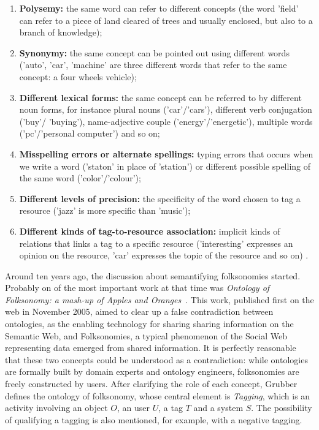 \begin{citacao}
\begin{enumerate}
\item \textbf{Polysemy:} the same word can refer to different concepts (the word ’field’ can refer to a piece of land cleared of trees and usually enclosed, but also to a branch of knowledge);
\item \textbf{Synonymy:} the same concept can be pointed out using different words (’auto’, ’car’, ’machine’ are three different words that refer to the same concept: a four wheels vehicle);
\item \textbf{Different lexical forms:} the same concept can be referred to by different noun forms, for instance plural nouns (’car’/’cars’), different verb conjugation (’buy’/ ’buying’), name-adjective couple (’energy’/’energetic’), multiple words (’pc’/’personal computer’) and so on;
\item \textbf{Misspelling errors or alternate spellings:} typing errors that occurs when we write a word (’staton’ in place of ’station’) or different possible spelling of the same word (’color’/’colour’);
\item \textbf{Different levels of precision:} the specificity of the word chosen to tag a resource (’jazz’ is more specific than ’music’);
\item \textbf{Different kinds of tag-to-resource association:} implicit kinds of relations that links a tag to a specific resource (’interesting’ expresses an opinion on the resource, ’car’ expresses the topic of the resource and so on) \cite{Marchetti2007}.
\end{enumerate}
\end{citacao}

Around ten years ago, the discussion about semantifying folksonomies started.
Probably on of the most important work at that time was \emph{Ontology of Folksonomy: a mash-up of Apples and Oranges}~\cite{Grubber2007}.
This work, published first on the web in November 2005, aimed to clear up a false contradiction between ontologies, as the enabling technology for sharing sharing information on the Semantic Web, and Folksonomies, a typical phenomenon of the Social Web representing data emerged from shared information.
It is perfectly reasonable that these two concepts could be understood as a contradiction: while ontologies are formally built by domain experts and ontology engineers, folksonomies are freely constructed by users.
After clarifying the role of each concept, Grubber defines the ontology of folksonomy, whose central element is \emph{Tagging}, which is an activity involving an object $O$, an user $U$, a tag $T$ and a system $S$.
The possibility of qualifying a tagging is also mentioned, for example, with a negative tagging.

